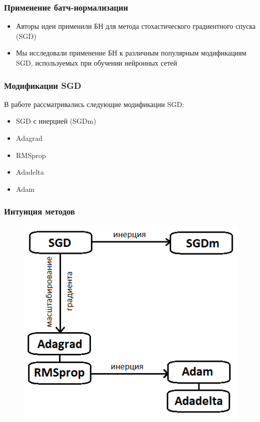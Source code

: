 \documentclass{beamer}
\begin{document}
\begin{frame}
\frametitle{Применение батч-нормализации}
\begin{itemize}
\item Авторы идеи применили БН для метода стохастического градиентного спуска (SGD)
\item Мы исследовали применение БН к различным популярным модификациям SGD, используемых при обучении нейронных сетей
\end{itemize}
\end{frame}
	
	

\begin{frame}
\frametitle{Модификации SGD}	
	
В работе рассматривались следующие модификации SGD:

\begin{itemize}
\item SGD с инерцией (SGDm) %
\item Adagrad %
\item RMSprop %
\item Adadelta %
\item Adam %
\end{itemize}

\end{frame}

\begin{frame}
\frametitle{Интуиция методов}
\begin{figure}
\includegraphics[scale=0.5]{methods.png}
\end{figure}
\end{frame}
\end{document}
